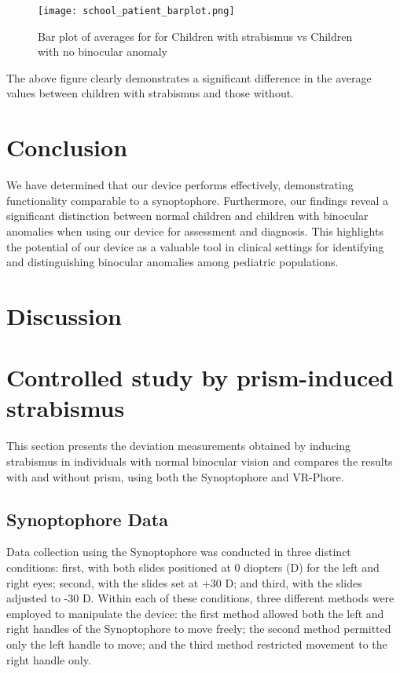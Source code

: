 \documentclass{article}
\begin{document}
\begin{figure}[h!]
  \centering
  \texttt{[image: school\_patient\_barplot.png]}
  \caption{Bar plot of averages for for Children with strabismus vs Children with no binocular anomaly}
  \label{fig:example}
\end{figure}
The above figure clearly demonstrates a significant difference in the average values between children with strabismus and those without.

\section{Conclusion}
We have determined that our device performs effectively, demonstrating functionality comparable to a synoptophore. Furthermore, our findings reveal a significant distinction between normal children and children with binocular anomalies when using our device for assessment and diagnosis. This highlights the potential of our device as a valuable tool in clinical settings for identifying and distinguishing binocular anomalies among pediatric populations.

\section{Discussion}

\section{Controlled study by prism-induced strabismus}

This section presents the deviation measurements obtained by inducing strabismus in individuals with normal binocular vision and compares the results with and without prism, using both the Synoptophore and VR-Phore.

\subsection{Synoptophore Data}

Data collection using the Synoptophore was conducted in three distinct conditions: first, with both slides positioned at 0 diopters (D) for the left and right eyes; second, with the slides set at +30 D; and third, with the slides adjusted to -30 D. Within each of these conditions, three different methods were employed to manipulate the device: the first method allowed both the left and right handles of the Synoptophore to move freely; the second method permitted only the left handle to move; and the third method restricted movement to the right handle only.
\end{document}
